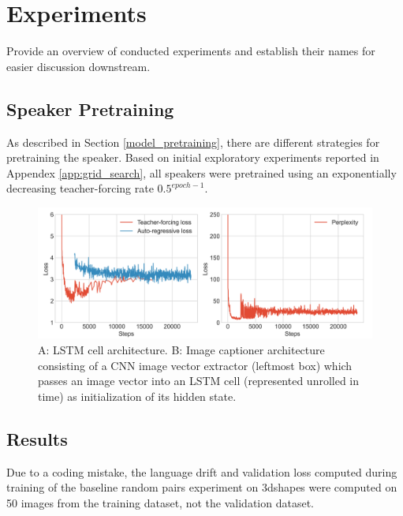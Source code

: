 \section{Experiments}


Provide an overview of conducted experiments and establish their names for easier discussion downstream.

\subsection{Speaker Pretraining}
As described in Section \ref{model_pretraining}, there are different strategies for pretraining the speaker. Based on initial exploratory experiments reported in Appendex \ref{app:grid_search}, all speakers were pretrained using an exponentially decreasing teacher-forcing rate $0.5^{epoch-1}$.

\begin{figure}
	\centering
	\includegraphics[width=\linewidth]{images/coco_pretraining_losses_ppls.png}
	\caption{A: LSTM cell architecture. B: Image captioner architecture consisting of a CNN image vector extractor (leftmost box) which passes an image vector into an LSTM cell (represented unrolled in time) as initialization of its hidden state.}
	\label{fig:coco_pretraining}
\end{figure}  


\subsection{Results}
Due to a coding mistake, the language drift and validation loss computed during training of the baseline random pairs experiment on 3dshapes were computed on 50 images from the training dataset, not the validation dataset.

